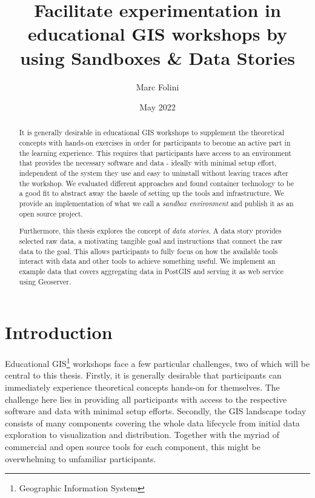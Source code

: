 \documentclass[11pt, a4paper, oneside, parskip=full-]{scrartcl}
\title{Facilitate experimentation in educational GIS workshops by using Sandboxes \& Data Stories}
\author{Marc Folini}
\date{May 2022}
\begin{document}
\begin{titlepage}
  \setcounter{page}{1}
  \clearpage\maketitle
  \thispagestyle{empty}
  \begin{abstract}
    It is generally desirable in educational GIS workshops to supplement the theoretical concepts with hands-on
    exercises in order for participants to become an active part in the learning experience. This requires that
    participants have access to an environment that provides the necessary software and data - ideally with minimal
    setup effort, independent of the system they use and easy to uninstall without leaving traces after the workshop. We
    evaluated different approaches and found container technology to be a good fit to abstract away the hassle of
    setting up the tools and infrastructure. We provide an implementation of what we call a \emph{sandbox environment}
    and publish it as an open source project.

    Furthermore, this thesis explores the concept of \emph{data stories}. A data story provides selected raw data, a
    motivating tangible goal and instructions that connect the raw data to the goal. This allows participants to fully
    focus on how the available tools interact with data and other tools to achieve something useful. We implement an
    example data that covers aggregating data in PostGIS and serving it as web service using Geoserver.
  \end{abstract}
\end{titlepage}

\newpage
\tableofcontents

\newpage
{}
\setcounter{page}{1}
\section{Introduction}
Educational GIS\footnote{Geographic Information System} workshops face a few particular challenges, two of which will be
central to this thesis. Firstly, it is generally desirable that participants can immediately experience theoretical
concepts hands-on for themselves. The challenge here lies in providing all participants with access to the respective
software and data with minimal setup efforts. Secondly, the GIS landscape today consists of many components covering the
whole data lifecycle from initial data exploration to visualization and distribution. Together with the myriad of
commercial and open source tools for each component, this might be overwhelming to unfamiliar participants.
\end{document}
